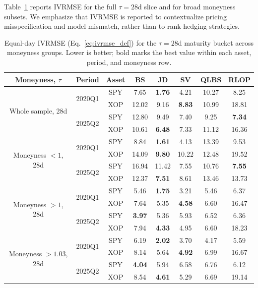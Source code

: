 Table~\ref{tab:ivrmse_28d_by_moneyness} reports IVRMSE for the full $\tau=28$d slice and for broad moneyness subsets.
We emphasize that IVRMSE is reported to contextualize pricing misspecification and model mismatch, rather than to rank hedging strategies.


\begin{table}[t]
\centering
\small
\begin{tabular}{cc c c c c c c}
\toprule
Moneyness, $\tau$ & Period & Asset & BS & JD & SV & QLBS & RLOP \\
\midrule
\multirow{4}{*}{Whole sample, 28d}
& \multirow{2}{*}{2020Q1} & SPY & 7.65 & \textbf{1.76} & 4.21 & 10.27 & 8.25 \\
&                        & XOP & 12.02 & 9.16 & \textbf{8.83} & 10.99 & 18.81 \\
\cmidrule(lr){2-8}
& \multirow{2}{*}{2025Q2} & SPY & 12.80 & 9.49 & 7.40 & 9.25 & \textbf{7.34} \\
&                        & XOP & 10.61 & \textbf{6.48} & 7.33 & 11.12 & 16.36 \\
\midrule
\multirow{4}{*}{Moneyness $<1$, 28d}
& \multirow{2}{*}{2020Q1} & SPY & 8.84 & \textbf{1.61} & 4.13 & 13.39 & 9.53 \\
&                        & XOP & 14.09 & \textbf{9.80} & 10.22 & 12.48 & 19.52 \\
\cmidrule(lr){2-8}
& \multirow{2}{*}{2025Q2} & SPY & 16.94 & 11.42 & 7.55 & 10.76 & \textbf{7.55} \\
&                        & XOP & 12.37 & \textbf{7.51} & 8.61 & 13.46 & 13.73 \\
\midrule
\multirow{4}{*}{Moneyness $>1$, 28d}
& \multirow{2}{*}{2020Q1} & SPY & 5.46 & \textbf{1.75} & 3.21 & 5.46 & 6.37 \\
&                        & XOP & 7.64 & 5.35 & \textbf{4.58} & 6.60 & 16.47 \\
\cmidrule(lr){2-8}
& \multirow{2}{*}{2025Q2} & SPY & \textbf{3.97} & 5.36 & 5.93 & 6.52 & 6.36 \\
&                        & XOP & 7.94 & \textbf{4.33} & 4.95 & 6.60 & 18.23 \\
\midrule
\multirow{4}{*}{Moneyness $>1.03$, 28d}
& \multirow{2}{*}{2020Q1} & SPY & 6.19 & \textbf{2.02} & 3.70 & 4.17 & 5.59 \\
&                        & XOP & 8.14 & 5.64 & \textbf{4.92} & 6.99 & 16.67 \\
\cmidrule(lr){2-8}
& \multirow{2}{*}{2025Q2} & SPY & \textbf{4.04} & 5.94 & 6.58 & 6.76 & 6.12 \\
&                        & XOP & 8.54 & \textbf{4.61} & 5.29 & 6.69 & 19.14 \\
\bottomrule
\end{tabular}
\caption{Equal-day IVRMSE (Eq.~\eqref{eq:ivrmse_def}) for the $\tau=28$d maturity bucket across moneyness groups.
Lower is better; bold marks the best value within each asset, period, and moneyness row.}
\label{tab:ivrmse_28d_by_moneyness}
\end{table}

